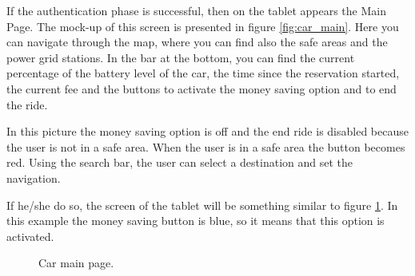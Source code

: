 If the authentication phase is successful, then on the tablet appears the Main Page. The mock-up of this screen is presented in figure \ref{fig:car_main}. Here you can navigate through the map, where you can find also the safe areas and the power grid stations. In the bar at the bottom, you can find the current percentage of the battery level of the car, the time since the reservation started, the current fee and the buttons to activate the money saving option and to end the ride.

In this picture the money saving option is off and the end ride is disabled because the user is not in a safe area. When the user is in a safe area the button becomes red. Using the search bar, the user can select a destination and set the navigation.

If he/she do so, the screen of the tablet will be something similar to figure \ref{fig:car_ride}. In this example the money saving button is blue, so it means that this option is activated.

\begin{figure}
    \vspace*{-2cm}
    \caption{Car main page.}
	\label{fig:car_ride}
\end{figure}
